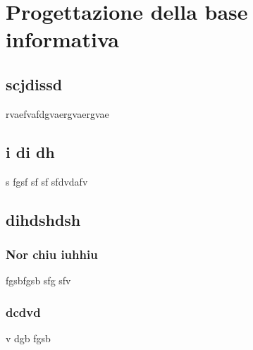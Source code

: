 \section{Progettazione della base informativa}
	\subsection{scjdissd}
	rvaefvafdgvaergvaergvae
	\subsection{ i di dh}
	 s fgsf sf sf sfdvdafv
	\subsection{dihdshdsh}
		\subsubsection{Nor chiu iuhhiu}
		fgsbfgsb sfg sfv 
		\subsubsection{dcdvd}
		v dgb fgsb
		


